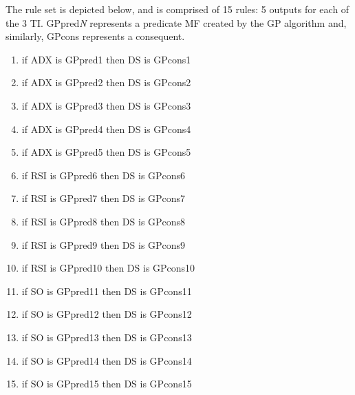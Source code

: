 \documentclass[a4paper,twoside]{article}
\begin{document}
The rule set is depicted below, and is comprised of 15 rules: 5
outputs for each of the 3 TI. GPpred\textit{N} represents a predicate
MF created by the GP algorithm and, similarly, GPcons
represents a consequent. 

\begin{enumerate}
\item if ADX is GPpred1 then DS is GPcons1
\item if ADX is GPpred2 then DS is GPcons2
\item if ADX is GPpred3 then DS is GPcons3
\item if ADX is GPpred4 then DS is GPcons4
\item if ADX is GPpred5 then DS is GPcons5

\item if RSI is GPpred6 then DS is GPcons6
\item if RSI is GPpred7 then DS is GPcons7
\item if RSI is GPpred8 then DS is GPcons8
\item if RSI is GPpred9 then DS is GPcons9
\item if RSI is GPpred10 then DS is GPcons10

\item if SO is GPpred11 then DS is GPcons11
\item if SO is GPpred12 then DS is GPcons12
\item if SO is GPpred13 then DS is GPcons13
\item if SO is GPpred14 then DS is GPcons14
\item if SO is GPpred15 then DS is GPcons15
\end{enumerate}

\end{document}
